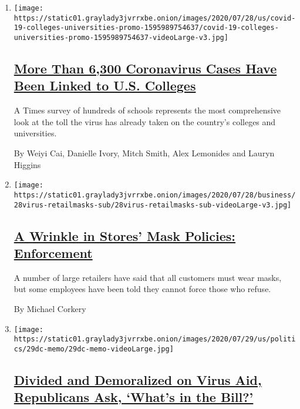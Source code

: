 \begin{enumerate}
\def\labelenumi{\arabic{enumi}.}
\item
  \texttt{[image: https://static01.graylady3jvrrxbe.onion/images/2020/07/28/us/covid-19-colleges-universities-promo-1595989754637/covid-19-colleges-universities-promo-1595989754637-videoLarge-v3.jpg]}

  \hypertarget{more-than-6300-coronavirus-cases-have-been-linked-to-us-colleges}{%
  \subsection{\texorpdfstring{\href{/interactive/2020/07/28/us/covid-19-colleges-universities.html}{More
  Than 6,300 Coronavirus Cases Have Been Linked to U.S.
  Colleges}}{More Than 6,300 Coronavirus Cases Have Been Linked to U.S. Colleges}}\label{more-than-6300-coronavirus-cases-have-been-linked-to-us-colleges}}

  A Times survey of hundreds of schools represents the most
  comprehensive look at the toll the virus has already taken on the
  country's colleges and universities.

  By Weiyi Cai, Danielle Ivory, Mitch Smith, Alex Lemonides and Lauryn
  Higgins
\item
  \texttt{[image: https://static01.graylady3jvrrxbe.onion/images/2020/07/28/business/28virus-retailmasks-sub/28virus-retailmasks-sub-videoLarge-v3.jpg]}

  \hypertarget{a-wrinkle-in-stores-mask-policies-enforcement}{%
  \subsection{\texorpdfstring{\href{/2020/07/29/business/coronavirus-masks-stores-walmart.html}{A
  Wrinkle in Stores' Mask Policies:
  Enforcement}}{A Wrinkle in Stores' Mask Policies: Enforcement}}\label{a-wrinkle-in-stores-mask-policies-enforcement}}

  A number of large retailers have said that all customers must wear
  masks, but some employees have been told they cannot force those who
  refuse.

  By Michael Corkery
\item
  \texttt{[image: https://static01.graylady3jvrrxbe.onion/images/2020/07/29/us/politics/29dc-memo/29dc-memo-videoLarge.jpg]}

  \hypertarget{divided-and-demoralized-on-virus-aid-republicans-ask-whats-in-the-bill}{%
  \subsection{\texorpdfstring{\href{/2020/07/29/us/politics/republicans-congress-virus-aid.html}{Divided
  and Demoralized on Virus Aid, Republicans Ask, `What's in the
  Bill?'}}{Divided and Demoralized on Virus Aid, Republicans Ask, `What's in the Bill?'}}\label{divided-and-demoralized-on-virus-aid-republicans-ask-whats-in-the-bill}}


\end{enumerate}
